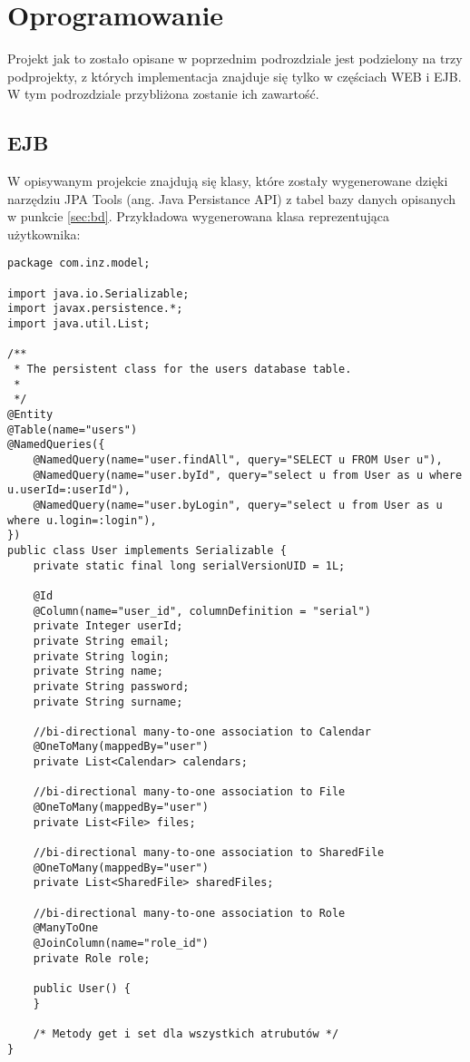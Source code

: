 \section{Oprogramowanie}
Projekt jak to zostało opisane w poprzednim podrozdziale jest podzielony na trzy podprojekty, z których implementacja znajduje się tylko w częściach WEB i EJB. W tym podrozdziale przybliżona zostanie ich zawartość.
\subsection{EJB}
W opisywanym projekcie znajdują się klasy, które zostały wygenerowane dzięki narzędziu JPA Tools (ang. Java Persistance API) z tabel bazy danych opisanych w punkcie \ref{sec:bd}. Przykładowa wygenerowana klasa reprezentująca użytkownika:
\begin{lstlisting}
package com.inz.model;

import java.io.Serializable;
import javax.persistence.*;
import java.util.List;

/**
 * The persistent class for the users database table.
 * 
 */
@Entity
@Table(name="users")
@NamedQueries({
	@NamedQuery(name="user.findAll", query="SELECT u FROM User u"),
	@NamedQuery(name="user.byId", query="select u from User as u where u.userId=:userId"),
	@NamedQuery(name="user.byLogin", query="select u from User as u where u.login=:login"),
})
public class User implements Serializable {
	private static final long serialVersionUID = 1L;

	@Id
	@Column(name="user_id", columnDefinition = "serial")
	private Integer userId;
	private String email;
	private String login;
	private String name;
	private String password;
	private String surname;

	//bi-directional many-to-one association to Calendar
	@OneToMany(mappedBy="user")
	private List<Calendar> calendars;

	//bi-directional many-to-one association to File
	@OneToMany(mappedBy="user")
	private List<File> files;

	//bi-directional many-to-one association to SharedFile
	@OneToMany(mappedBy="user")
	private List<SharedFile> sharedFiles;

	//bi-directional many-to-one association to Role
	@ManyToOne
	@JoinColumn(name="role_id")
	private Role role;

	public User() {
	}

	/* Metody get i set dla wszystkich atrubutów */
}
\end{lstlisting}
